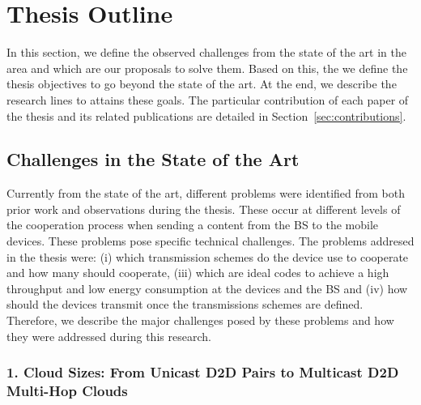 \section{Thesis Outline}\label{sec:intro_thesis_outline}

In this section, we define the observed challenges from the state of the art in the area and which are our proposals to solve them. Based on this, the we define the thesis objectives to go beyond the state of the art. At the end, we describe the research lines to attains these goals. The particular contribution of each paper of the thesis and its related publications are detailed in Section~\ref{sec:contributions}.

\subsection{Challenges in the State of the Art}
Currently from the state of the art, different problems were identified from both prior work and observations during the thesis. These occur at different levels of the cooperation process when sending a content from the \ac{BS} to the mobile devices. These problems pose specific technical challenges. The problems addresed in the thesis were: (i) which transmission schemes do the device use to cooperate and how many should cooperate, (iii) which are ideal codes to achieve a high throughput and low energy consumption at the devices and the \ac{BS} and (iv) how should the devices transmit once the transmissions schemes are defined. Therefore, we describe the major challenges posed by these problems and how they were addressed during this research.

\subsubsection{1. Cloud Sizes: From Unicast D2D Pairs to Multicast D2D Multi-Hop Clouds}
\label{sec:cloud_sizes}

